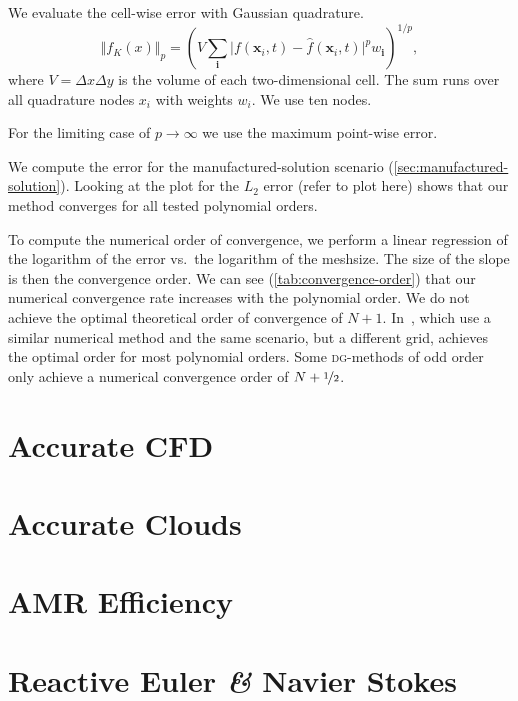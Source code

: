 We evaluate the cell-wise error with Gaussian quadrature.
 \begin{equation}
   \Vert f_K(x) \Vert_p = \left( V \sum_{\bm{i}} \vert f(\bm{x}_i, t) - \hat{f}(\bm{x}_i, t) \vert^p w_{{\bm{i}}}  \right)^{1/p},
 \end{equation}
where $V = \Delta x \Delta y$ is the volume of each two-dimensional cell.
The sum runs over all quadrature nodes $x_i$ with weights $w_i$.
We use ten nodes.

For the limiting case of $p \to \infty$ we use the maximum point-wise error.


We compute the error for the manufactured-solution scenario (\cref{sec:manufactured-solution}).
Looking at the plot for the $L_2$ error (refer to plot here) shows that our method converges for all tested polynomial orders.

To compute the numerical order of convergence, we perform a linear regression of the logarithm of the error vs.\ the logarithm of the meshsize.
The size of the slope is then the convergence order.
We can see (\cref{tab:convergence-order}) that our numerical convergence rate increases with the polynomial order.
We do not achieve the optimal theoretical order of convergence of $N+1$.
In~\cite{dumbser2010arbitrary}, which use a similar numerical method and the same scenario, but a different grid, \citeauthor{dumbser2010arbitrary} achieves the optimal order for most polynomial orders.
Some \textsc{dg}-methods of odd order only achieve a numerical convergence order of $N+\nicefrac{1}{2}$.

\section{Accurate CFD}
\section{Accurate Clouds}
\section{AMR Efficiency}
\section{Reactive Euler \textit{\&} Navier Stokes}

